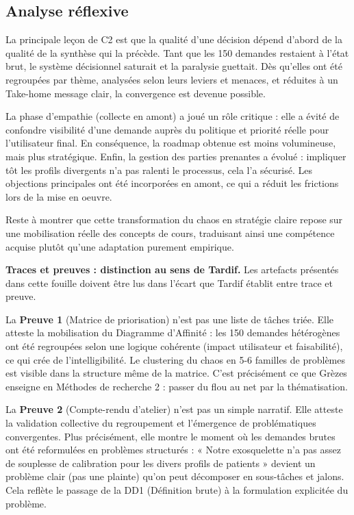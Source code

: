 \subsection{Analyse réflexive}

La principale leçon de C2 est que la qualité d'une décision dépend d'abord de la qualité de la synthèse qui la précède. Tant que les 150 demandes restaient à l'état brut, le système décisionnel saturait et la paralysie guettait. Dès qu'elles ont été regroupées par thème, analysées selon leurs leviers et menaces, et réduites à un Take-home message clair, la convergence est devenue possible.

La phase d'empathie (collecte en amont) a joué un rôle critique : elle a évité de confondre visibilité d'une demande auprès du politique et priorité réelle pour l'utilisateur final. En conséquence, la roadmap obtenue est moins volumineuse, mais plus stratégique. Enfin, la gestion des parties prenantes a évolué : impliquer tôt les profils divergents n'a pas ralenti le processus, cela l'a sécurisé. Les objections principales ont été incorporées en amont, ce qui a réduit les frictions lors de la mise en oeuvre.

Reste à montrer que cette transformation du chaos en stratégie claire repose sur une mobilisation réelle des concepts de cours, traduisant ainsi une compétence acquise plutôt qu'une adaptation purement empirique.

\medskip

\textbf{Traces et preuves : distinction au sens de Tardif.}
Les artefacts présentés dans cette fouille doivent être lus dans l'écart que Tardif établit entre trace et preuve.

La \textbf{Preuve 1} (Matrice de priorisation) n'est pas une liste de tâches triée. Elle atteste la mobilisation du Diagramme d'Affinité : les 150 demandes hétérogènes ont été regroupées selon une logique cohérente (impact utilisateur et faisabilité), ce qui crée de l'intelligibilité. Le clustering du chaos en 5-6 familles de problèmes est visible dans la structure même de la matrice. C'est précisément ce que Grèzes enseigne en Méthodes de recherche 2 : passer du flou au net par la thématisation.

La \textbf{Preuve 2} (Compte-rendu d'atelier) n'est pas un simple narratif. Elle atteste la validation collective du regroupement et l'émergence de problématiques convergentes. Plus précisément, elle montre le moment où les demandes brutes ont été reformulées en problèmes structurés : « Notre exosquelette n'a pas assez de souplesse de calibration pour les divers profils de patients » devient un problème clair (pas une plainte) qu'on peut décomposer en sous-tâches et jalons. Cela reflète le passage de la DD1 (Définition brute) à la formulation explicitée du problème.

